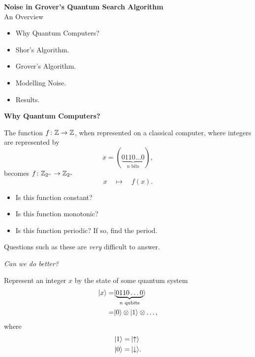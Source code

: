 \documentclass{slides}
\begin{document}
\begin{center}
\textbf{Noise in Grover's Quantum Search Algorithm}\\
\bigskip
\bigskip
{An Overview}
\end{center}

\begin{itemize}
\item Why Quantum Computers?
\item Shor's Algorithm.
\item Grover's Algorithm.
\item Modelling Noise.
\item Results.
\end{itemize}

\pagebreak


\begin{center}
\textbf{Why Quantum Computers?}
\end{center}

The function $f\colon{\mathbb{Z}}\to{\mathbb{Z}}$,
when represented on a classical computer, where
integers are represented by
\begin{equation*}
x=(\underbrace{0110\ldots0}_{n\text{ bits}}),%
\end{equation*}
becomes $f\colon{\mathbb{Z}}_{2^n}\to{\mathbb{Z}}_{2^n}$
\begin{equation*}
x\quad\mapsto\quad f(x).
\end{equation*}
\begin{itemize}
\item Is this function constant?
\item Is this function monotonic?
\item Is this function periodic?  If so, find the period.
\end{itemize}
Questions such as these are \emph{very} difficult to answer.

\begin{center}
{\sl Can we do better?}
\end{center}

\pagebreak

Represent an integer $x$ by the state of some quantum system
\begin{equation*}
\begin{split}
{|{x}\rangle}=&{|{\underbrace{0110\ldots0}_{n\text{ qubits}}}\rangle}\\
 =& {|{0}\rangle}\otimes
             {|{1}\rangle}\otimes\ldots,
\end{split}
\end{equation*}
where
\begin{equation*}
\begin{split}
    {|{1}\rangle} =& \,{|{\uparrow}\rangle}\\
    {|{0}\rangle} =& \,{|{\downarrow}\rangle}.
\end{split}
\end{equation*}
\end{document}

